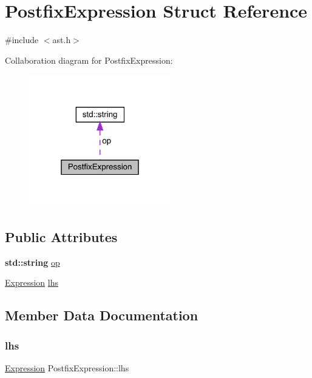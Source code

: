 \hypertarget{struct_postfix_expression}{}\section{Postfix\+Expression Struct Reference}
\label{struct_postfix_expression}


{\ttfamily \#include $<$ast.\+h$>$}



Collaboration diagram for Postfix\+Expression\+:\nopagebreak
\begin{figure}[H]
\begin{center}
\leavevmode
\includegraphics[width=175pt]{struct_postfix_expression__coll__graph}
\end{center}
\end{figure}
\subsection*{Public Attributes}
\begin{DoxyCompactItemize}
\item 
\textbf{ std\+::string} \hyperlink{struct_postfix_expression_a9ce1fb591d6787626d2eda8a9ca0a3cd}{op}
\item 
\hyperlink{ast_8h_a4cb273a4d960cd13ea17d08f254493e8}{Expression} \hyperlink{struct_postfix_expression_a106fb8d5de61a537a2a33bee90d08a59}{lhs}
\end{DoxyCompactItemize}


\subsection{Member Data Documentation}
\mbox{\label{struct_postfix_expression_a106fb8d5de61a537a2a33bee90d08a59}} 
\subsubsection{\texorpdfstring{lhs}{lhs}}
{\footnotesize\ttfamily \hyperlink{ast_8h_a4cb273a4d960cd13ea17d08f254493e8}{Expression} Postfix\+Expression\+::lhs}

